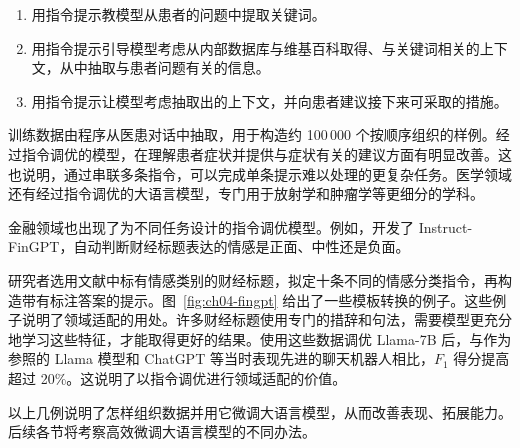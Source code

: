 \begin{enumerate}
\item 用指令提示教模型从患者的问题中提取关键词。
\item 用指令提示引导模型考虑从内部数据库与维基百科取得、与关键词相关的上下文，从中抽取与患者问题有关的信息。
\item 用指令提示让模型考虑抽取出的上下文，并向患者建议接下来可采取的措施。
\end{enumerate}

训练数据由程序从医患对话中抽取，用于构造约 100\,000 个按顺序组织的样例。经过指令调优的模型，在理解患者症状并提供与症状有关的建议方面有明显改善。这也说明，通过串联多条指令，可以完成单条提示难以处理的更复杂任务。医学领域还有经过指令调优的大语言模型，专门用于放射学和肿瘤学等更细分的学科。

金融领域也出现了为不同任务设计的指令调优模型。例如，开发了 Instruct-FinGPT，自动判断财经标题表达的情感是正面、中性还是负面。


研究者选用文献中标有情感类别的财经标题，拟定十条不同的情感分类指令，再构造带有标注答案的提示。图~\ref{fig:ch04-fingpt} 给出了一些模板转换的例子。这些例子说明了领域适配的用处。许多财经标题使用专门的措辞和句法，需要模型更充分地学习这些特征，才能取得更好的结果。使用这些数据调优 Llama-7B 后，与作为参照的 Llama 模型和 ChatGPT 等当时表现先进的聊天机器人相比，$F_1$ 得分提高超过 20\%。这说明了以指令调优进行领域适配的价值。

以上几例说明了怎样组织数据并用它微调大语言模型，从而改善表现、拓展能力。后续各节将考察高效微调大语言模型的不同办法。
